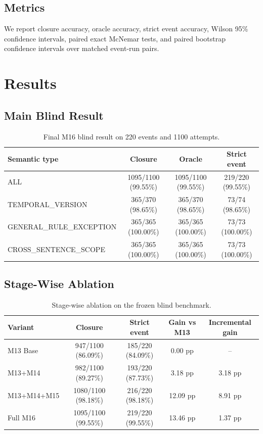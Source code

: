 \documentclass[11pt]{article}
\begin{document}
\subsection{Metrics}

We report closure accuracy, oracle accuracy, strict event accuracy, Wilson 95\% confidence intervals, paired exact McNemar tests, and paired bootstrap confidence intervals over matched event-run pairs.

\section{Results}

\subsection{Main Blind Result}

\begin{table}[t]
\centering
\caption{Final M16 blind result on 220 events and 1100 attempts.}
\label{tab:main}
\begin{tabular}{lccc}
\toprule
Semantic type & Closure & Oracle & Strict event \\
\midrule
ALL & 1095/1100 (99.55\%) & 1095/1100 (99.55\%) & 219/220 (99.55\%) \\
TEMPORAL\_VERSION & 365/370 (98.65\%) & 365/370 (98.65\%) & 73/74 (98.65\%) \\
GENERAL\_RULE\_EXCEPTION & 365/365 (100.00\%) & 365/365 (100.00\%) & 73/73 (100.00\%) \\
CROSS\_SENTENCE\_SCOPE & 365/365 (100.00\%) & 365/365 (100.00\%) & 73/73 (100.00\%) \\
\bottomrule
\end{tabular}
\end{table}

\subsection{Stage-Wise Ablation}

\begin{table}[t]
\centering
\caption{Stage-wise ablation on the frozen blind benchmark.}
\label{tab:ablation}
\begin{tabular}{lcccc}
\toprule
Variant & Closure & Strict event & Gain vs M13 & Incremental gain \\
\midrule
M13 Base & 947/1100 (86.09\%) & 185/220 (84.09\%) & 0.00 pp & -- \\
M13+M14 & 982/1100 (89.27\%) & 193/220 (87.73\%) & 3.18 pp & 3.18 pp \\
M13+M14+M15 & 1080/1100 (98.18\%) & 216/220 (98.18\%) & 12.09 pp & 8.91 pp \\
Full M16 & 1095/1100 (99.55\%) & 219/220 (99.55\%) & 13.46 pp & 1.37 pp \\
\bottomrule
\end{tabular}
\end{table}
\end{document}

